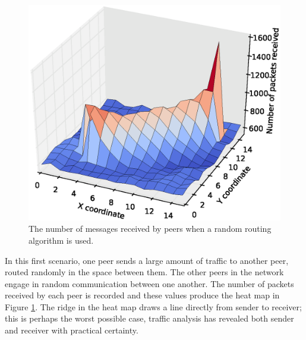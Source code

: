 \documentclass[ %
                    author={Luke Murray},
                supervisor={Dr. Simon Hollis},
                     title={Shadow Peer-to-Peer Networks},
                  subtitle={},
                    degree={MEng},
                      year={2013} ]{thesis}
\begin{document}
\begin{figure}[h]
    \centering
    \begin{minipage}[b]{0.8\linewidth}
        \centering
        \includegraphics[width=\linewidth]{diagrams/heat_map_random.eps}
        \caption{The number of messages received by peers when a random routing algorithm is used.}
        \label{heatmap_random}
    \end{minipage}
\end{figure}

In this first scenario, one peer sends a large amount of traffic to another peer, routed randomly in the space between them. The other peers in the network engage in random communication between one another. The number of packets received by each peer is recorded and these values produce the heat map in Figure \ref{heatmap_random}. The ridge in the heat map draws a line directly from sender to receiver; this is perhaps the worst possible case, traffic analysis has revealed both sender and receiver with practical certainty.
\end{document}
